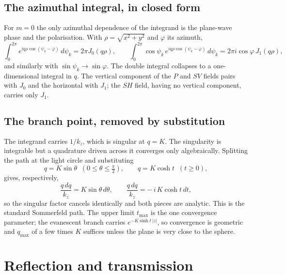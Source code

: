 \documentclass[11pt,a4paper]{article}
\begin{document}
\subsection{The azimuthal integral, in closed form}

For $m=0$ the only azimuthal dependence of the integrand is the plane-wave
phase and the polarisation.  With $\rho = \sqrt{x^2+y^2}$ and $\varphi$ its
azimuth,
\begin{equation}\label{eq:azim}
  \int_0^{2\pi}\!\! e^{iq\rho\cos(\psi_k-\varphi)}\,d\psi_k = 2\pi J_0(q\rho),
  \qquad
  \int_0^{2\pi}\!\!\cos\psi_k\,e^{iq\rho\cos(\psi_k-\varphi)}\,d\psi_k
    = 2\pi i\cos\varphi\,J_1(q\rho),
\end{equation}
and similarly with $\sin\psi_k \to \sin\varphi$.  The double integral collapses
to a one-dimensional integral in $q$.  The vertical component of the $P$ and
$SV$ fields pairs with $J_0$ and the horizontal with $J_1$; the $SH$ field,
having no vertical component, carries only $J_1$.

\subsection{The branch point, removed by substitution}

The integrand carries $1/k_z$, which is singular at $q = K$.  The singularity
is integrable but a quadrature driven across it converges only algebraically.
Splitting the path at the light circle and substituting
\begin{equation}\label{eq:sommer}
  q = K\sin\theta \;\;(0\le\theta\le\tfrac{\pi}{2}), \qquad
  q = K\cosh t \;\;(t\ge0),
\end{equation}
gives, respectively,
\begin{equation}
  \frac{q\,dq}{k_z} = K\sin\theta\,d\theta,
  \qquad
  \frac{q\,dq}{k_z} = -\,i\,K\cosh t\,dt,
\end{equation}
so the singular factor cancels identically and both pieces are analytic.  This
is the standard Sommerfeld path.  The upper limit $t_{\max}$ is the one
convergence parameter; the evanescent branch carries $e^{-K\sinh t\,|z|}$, so
convergence is geometric and $q_{\max}$ of a few times $K$ suffices unless the
plane is very close to the sphere.

\section{Reflection and transmission}\label{sec:rt}
\end{document}
